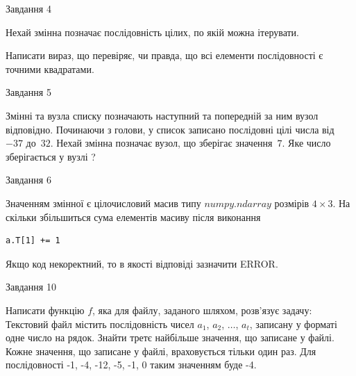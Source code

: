 \documentclass[12pt, ukrainian]{article}
\begin{document}
{\begin{minipage}[t]{8.0cm}
\begin{verbatim}
\end{verbatim}            

\end{minipage}


               
{\begin{center}Завдання {4}\end{center}}
\vspace{-4mm}
Нехай змінна  позначає послідовність цілих, по якій можна ітерувати.

Написати вираз, що перевіряє, чи правда, що всі елементи послідовності є точними квадратами.\par

\vspace{10mm}
               
{\begin{center}Завдання {5}\end{center}}
\vspace{-4mm}
Змінні  та  вузла списку позначають наступний та попередній за ним вузол відповідно. Починаючи з голови, у список записано послідовні цілі числа від~$-37$ до~$32$. Нехай змінна  позначає вузол, що зберігає значення~$7$.
Яке число зберігається у вузлі  ?\par

               
{\begin{center}Завдання {6}\end{center}}
\vspace{-4mm}
Значенням змінної  є цілочисловий масив типу $numpy.ndarray$ розмірів $4{\times}3$. На скільки збільшиться сума елементів масиву  після виконання
\begin{verbatim}
a.T[1] += 1
\end{verbatim}


Якщо код некоректний, то в якості відповіді зазначити ERROR.\par

               
{\begin{center}Завдання {10}\end{center}}
\vspace{-4mm}

Написати функцію $f$, яка для файлу, заданого шляхом, розв’язує задачу:\\ Текстовий файл містить послідовність чисел $a_1$, $a_2$, $\ldots$, $a_t$, записану у форматі одне число на рядок. Знайти третє найбільше значення, що записане у файлі. Кожне значення, що записане у файлі, враховується тільки один раз. Для послідовності -1, -4, -12, -5, -1, 0 таким значенням буде -4.

}
\end{document}
